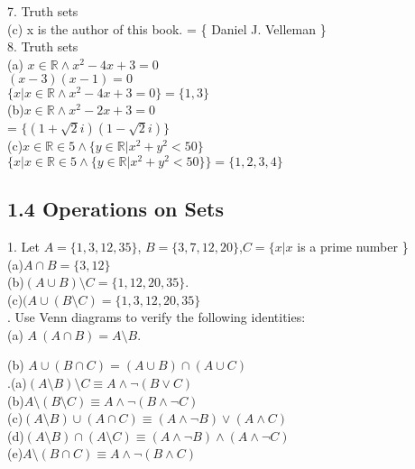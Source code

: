\documentclass{article}
\begin{document}
7. Truth sets\\
(c) x is the author of this book. = \{ Daniel J. Velleman \}\\
8. Truth sets\\
(a) $x \in \mathbb{R} \wedge x^2 -4x + 3 = 0$\\
$(x -3)(x - 1) = 0$\\
$\{x | x \in \mathbb{R} \wedge x^2 - 4x + 3 = 0\} = \{1,3\}$\\
(b)$x \in \mathbb{R} \wedge x^2 -2x + 3 = 0$\\
= $\{ (1 + \sqrt 2i)(1 - \sqrt 2i)\}$\\
(c)$x \in \mathbb{R} \in 5 \wedge \{y \in \mathbb{R} | x^2 + y^2 < 50\}$\\
$\{x | x \in \mathbb{R} \in 5 \wedge \{y \in \mathbb{R} | x^2 + y^2 < 50\}\} = \{1,2,3,4\}$\\
\subsection*{1.4 Operations on Sets}
1. Let $A = \{1,3,12,35\}$, $B = \{3,7,12,20\}$,$C = \{x | x$ is a prime number \}\\
(a)$A \cap B = \{3,12\}$\\
(b)$(A \cup B) \setminus C = \{1,12,20,35\}$.\\
(c)$(A \cup (B \setminus C) = \{1,3,12,20,35\}$\\
. Use Venn diagrams to verify the following identities:\\
(a) $A \ (A \cap B) = A \setminus B$.\\

\begin{center}
\end{center}
(b) $A \cup (B \cap C) = (A \cup B) \cap (A \cup C)$\\
.(a)$(A \setminus B) \setminus C \equiv A \wedge \neg(B \vee C) $\\
(b)$A \setminus (B \setminus C)\equiv A \wedge \neg(B \wedge \neg C)$\\
(c)$(A \setminus B) \cup (A \cap C)\equiv (A \wedge \neg B) \vee (A \wedge C)$\\
(d)$(A \setminus B) \cap (A \setminus C) \equiv (A \wedge \neg B)\wedge (A \wedge \neg C)$\\
(e)$A \setminus (B \cap C) \equiv A \wedge \neg (B \wedge C)$\\
\newline
\end{document}
